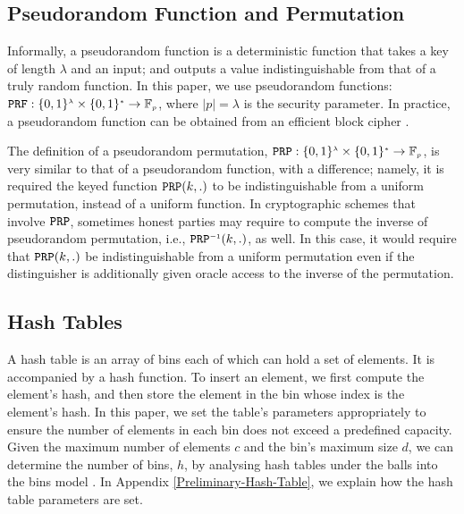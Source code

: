 %

\vs
\vs
\subsection{Pseudorandom Function and Permutation}


Informally, a pseudorandom function is a deterministic function that takes a key of length $\lambda$ and an input; and outputs a value  indistinguishable from that of  a truly random function.  In this paper, we use pseudorandom functions:   $\mathtt {PRF}: \{0,1\}^{\scriptscriptstyle \lambda}\times \{0,1\}^{\scriptscriptstyle *} \rightarrow  \mathbb{F}_{\scriptscriptstyle p}$, where $|p|=\lambda$ is the security parameter. In practice, a pseudorandom function can be obtained from an efficient block cipher \cite{DBLP:books/crc/KatzLindell2007}. 


The definition of a pseudorandom permutation, $\mathtt {PRP}: \{0,1\}^{\scriptscriptstyle \lambda}\times \{0,1\}^{\scriptscriptstyle *} \rightarrow  \mathbb{F}_{\scriptscriptstyle p}$, is very similar to that of a pseudorandom function, with a difference; namely, it is required the keyed function $\mathtt{PRP}(k,.)$ to be indistinguishable from a uniform permutation, instead of a uniform function. In cryptographic schemes that involve $\mathtt{PRP}$, sometimes honest parties may require to compute the inverse of pseudorandom permutation, i.e., $\mathtt {PRP}^{\scriptscriptstyle -1}(k, .)$, as well. In this case, it would require that $\mathtt{PRP}(k,.)$ be indistinguishable from a uniform permutation even if the distinguisher is additionally given oracle access to the inverse of the permutation. 


\vs



\vs
\vs
\subsection{Hash Tables}
A hash table is an array of   bins each of which can hold a set of elements. It is accompanied by a hash function. To insert an element, we first compute the element's hash,  and then store the element in the bin whose index is the element's hash. In this paper, we set the table's parameters appropriately to ensure the number of elements in each bin does not exceed a predefined capacity. Given the maximum number of elements $c$ and the bin's maximum size $d$, we can determine the number of bins, $h$, by analysing hash tables under the balls into the bins model  \cite{DBLP:conf/stoc/BerenbrinkCSV00}. In Appendix \ref{Preliminary-Hash-Table}, we explain how the hash table parameters are set.

